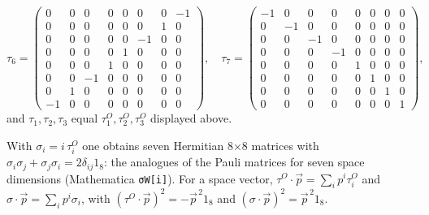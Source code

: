 \documentclass[10pt,a4paper]{article}
\begin{document}
\begin{equation*}
\tau_6=\begin{pmatrix}0 & 0 & 0 & 0 & 0 & 0 & 0 & -1 \\ 0 & 0 & 0 & 0 & 0 & 0 & 1 & 0 \\ 0 & 0 & 0 & 0 & 0 & -1 & 0 & 0 \\ 0 & 0 & 0 & 0 & 1 & 0 & 0 & 0 \\ 0 & 0 & 0 & 1 & 0 & 0 & 0 & 0 \\ 0 & 0 & -1 & 0 & 0 & 0 & 0 & 0 \\ 0 & 1 & 0 & 0 & 0 & 0 & 0 & 0 \\ -1 & 0 & 0 & 0 & 0 & 0 & 0 & 0\end{pmatrix},\quad \tau_7=\begin{pmatrix}-1 & 0 & 0 & 0 & 0 & 0 & 0 & 0 \\ 0 & -1 & 0 & 0 & 0 & 0 & 0 & 0 \\ 0 & 0 & -1 & 0 & 0 & 0 & 0 & 0 \\ 0 & 0 & 0 & -1 & 0 & 0 & 0 & 0 \\ 0 & 0 & 0 & 0 & 1 & 0 & 0 & 0 \\ 0 & 0 & 0 & 0 & 0 & 1 & 0 & 0 \\ 0 & 0 & 0 & 0 & 0 & 0 & 1 & 0 \\ 0 & 0 & 0 & 0 & 0 & 0 & 0 & 1\end{pmatrix},
\end{equation*}
and $\tau_1,\tau_2,\tau_3$ equal $\tau^{O}_1,\tau^{O}_2,\tau^{O}_3$ displayed above.

With $\sigma_i=i\,\tau^{O}_i$ one obtains seven Hermitian 8×8 matrices with $\sigma_i\sigma_j+\sigma_j\sigma_i=2\delta_{ij}1_8$: the analogues of the Pauli matrices for seven space dimensions (Mathematica \texttt{σW[i]}). For a space vector, $\tau^{O}\cdot\vec p=\sum_ip^i\tau^{O}_i$ and $\sigma\cdot\vec p=\sum_ip^i\sigma_i$, with $(\tau^{O}\cdot\vec p)^2=-\vec p^{\,2}1_8$ and $(\sigma\cdot\vec p)^2=\vec p^{\,2}1_8$.
\end{document}
